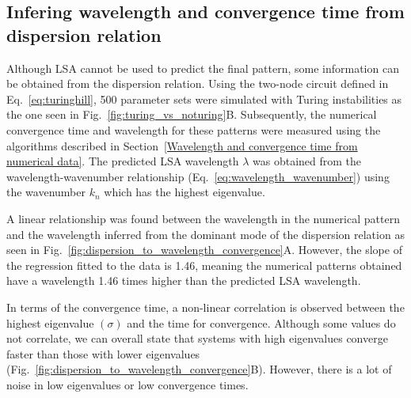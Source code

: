 \subsection{Infering wavelength and convergence time from dispersion relation}
Although LSA cannot be used to predict the final pattern, some information can be obtained from the dispersion relation.
Using the two-node circuit defined in Eq.~\ref{eq:turinghill}, 500 parameter sets were simulated with Turing instabilities as the one seen in Fig.~\ref{fig:turing_vs_noturing}B. Subsequently, the numerical convergence time and wavelength for these patterns were measured using the algorithms described in Section~\ref{Wavelength and convergence time from numerical data}.
The predicted LSA wavelength $\lambda$ was obtained from the wavelength-wavenumber relationship (Eq.~\ref{eq:wavelength_wavenumber}) using the wavenumber $k_{n}$ which has the highest eigenvalue.

A linear relationship was found between the wavelength in the numerical pattern and the wavelength inferred from the dominant mode of the dispersion relation as seen in Fig.~\ref{fig:dispersion_to_wavelength_convergence}A. However, the slope of the regression fitted to the data is 1.46, meaning the numerical patterns obtained have a wavelength 1.46 times higher than the predicted LSA wavelength.

In terms of the convergence time, a non-linear correlation is observed between the highest eigenvalue $(\sigma)$ and the time for convergence.
Although some values do not correlate, we can overall state that systems with high eigenvalues converge faster than those with lower eigenvalues (Fig.~\ref{fig:dispersion_to_wavelength_convergence}B).
However, there is a lot of noise in low eigenvalues or low convergence times.

